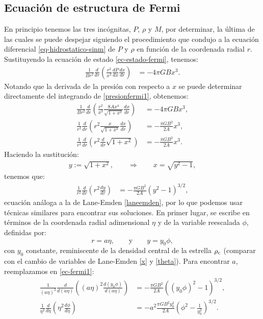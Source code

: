 \subsection{Ecuación de estructura de Fermi}
En principio tenemos las tres incógnitas, $P$, $\rho$ y $M$, por determinar, la última de las cuales se puede despejar siguiendo el procedimiento que condujo a la ecuación diferencial \eqref{eq-hidrostatico-sinm} de $P$ y $\rho$ en función de la coordenada radial $r$. Sustituyendo la ecuación de estado \eqref{ec-estado-fermi}, tenemos:
\begin{align}
\frac{1}{Br^2}\frac{d}{dr}\left(\frac{r^2}{x^3}\frac{dP}{dx}\frac{dx}{dr}\right)&=-4\pi G B x^3.
\end{align}
Notando que la derivada de la presión con respecto a $x$ se puede determinar directamente del integrando de \eqref{presionfermi1}, obtenemos:
\begin{align}
\frac{1}{Br^2}\frac{d}{dr}\left(\frac{r^2}{x^3}\frac{8Ax^4}{\sqrt{1+x^2}}\frac{dx}{dr}\right)&=-4\pi G B x^3,\\
\frac{1}{r^2}\frac{d}{dr}\left(r^2\frac{x}{\sqrt{1+x^2}}\frac{dx}{dr}\right)&=-\frac{\pi G B^2}{2A} x^3,\\
\frac{1}{r^2}\frac{d}{dr}\left(r^2\frac{d}{dr}\sqrt{1+x^2}\right)&=-\frac{\pi G B^2}{2A} x^3.
\end{align}
Haciendo la sustitución:
\begin{align}\label{sust-fermi}
 y:=\sqrt{1+x^2},\qquad\Rightarrow\qquad x=\sqrt{y^2-1},
\end{align}
tenemos que:
\begin{align}\label{ec-fermi1}
\frac{1}{r^2}\frac{d}{dr}\left(r^2\frac{dy}{dr}\right)&=-\frac{\pi G B^2}{2A} \left(y^2-1\right)^{3/2},
\end{align}
ecuación análoga a la de Lane-Emden \eqref{laneemden}, por lo que podemos usar técnicas similares para encontrar sus soluciones. En primer lugar, se escribe en términos de la coordenada radial adimensional $\eta$ y de la variable reescalada $\phi$, definidas por:
\begin{equation}\label{cambio-fermi-adim}
 r=a\eta,\qquad\text{y}\qquad y=y_0\phi,
\end{equation}
con $y_0$ constante, reminiscente de la densidad central de la estrella $\rho_{\rm c}$ (comparar con el cambio de variables de Lane-Emden \eqref{x} y \eqref{theta}). Para encontrar $a$, reemplazamos en \eqref{ec-fermi1}:
\begin{align}
\frac{1}{(a\eta)^2}\frac{d}{d(a\eta)}\left((a\eta)^2\frac{d(y_0\phi)}{d(a\eta)}\right)&=-\frac{\pi G B^2}{2A} \left((y_0\phi)^2-1\right)^{3/2},\\
\frac{1}{\eta^2}\frac{d}{d\eta}\left(\eta^2\frac{d\phi}{d\eta}\right)&=-a^2\frac{\pi G B^2 y_0^2}{2A}\left(\phi^2-\frac{1}{y_0^2}\right)^{3/2}.
\end{align}
